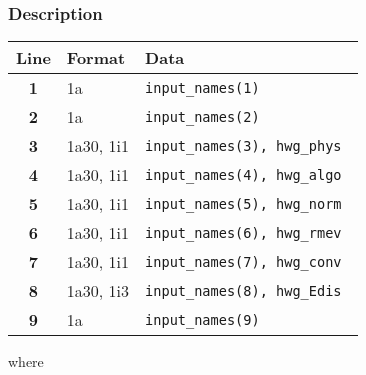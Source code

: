 \documentclass[a4paper,11pt]{article}
\begin{document}
\subsubsection*{Description}
\begin{center}
\begin{tabular}{|c|l|l|}
\hline
Line & Format & Data \\
\hline
 \textbf{1}   & 1a             & \tt input\_names(1)                   \\
 \textbf{2}   & 1a             & \tt input\_names(2)                   \\
 \textbf{3}   & 1a30, 1i1      & \tt input\_names(3), hwg\_phys        \\
 \textbf{4}   & 1a30, 1i1      & \tt input\_names(4), hwg\_algo        \\
 \textbf{5}   & 1a30, 1i1      & \tt input\_names(5), hwg\_norm        \\
 \textbf{6}   & 1a30, 1i1      & \tt input\_names(6), hwg\_rmev        \\
 \textbf{7}   & 1a30, 1i1      & \tt input\_names(7), hwg\_conv        \\
 \textbf{8}   & 1a30, 1i3      & \tt input\_names(8), hwg\_Edis        \\
 \textbf{9}   & 1a             & \tt input\_names(9)                   \\
\hline
\end{tabular}
\end{center}
where 
\end{document}
